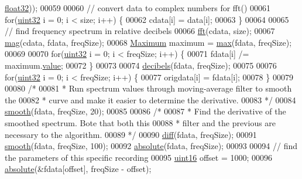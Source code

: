 \begin{DoxyCode}
      \hyperlink{definitions_8hpp_aacdc525d6f7bddb3ae95d5c311bd06a1}{float32}));
00059 
00060         \textcolor{comment}{// convert data to complex numbers for fft()}
00061         \textcolor{keywordflow}{for}(\hyperlink{definitions_8hpp_a1134b580f8da4de94ca6b1de4d37975e}{uint32} i = 0; i < size; i++) \{
00062             cdata[i] = data[i];
00063         \}
00064     
00065         \textcolor{comment}{// find frequency spectrum in relative decibels}
00066         \hyperlink{namespacevaso_af74f08a8afd7967b6c2b3c2b0e5fb1e9}{fft}(cdata, size);
00067         \hyperlink{namespacevaso_a5d355b5c326a852e2ce95c258450898c}{mag}(cdata, fdata, freqSize);
00068         \hyperlink{structMaximum}{Maximum} maximum = \hyperlink{namespacevaso_a122846d728be312454a452d379915e10}{max}(fdata, freqSize);
00069 
00070         \textcolor{keywordflow}{for}(\hyperlink{definitions_8hpp_a1134b580f8da4de94ca6b1de4d37975e}{uint32} i = 0; i < freqSize; i++) \{
00071             fdata[i] /= maximum.\hyperlink{structMaximum_aa7e84cbf37b694670142670014366969}{value};
00072         \}
00073 
00074         \hyperlink{namespacevaso_af9bb2211cf3478333dfc1873bf316263}{decibels}(fdata, freqSize);
00075 
00076         \textcolor{keywordflow}{for}(\hyperlink{definitions_8hpp_a1134b580f8da4de94ca6b1de4d37975e}{uint32} i = 0; i < freqSize; i++) \{
00077             origdata[i] = fdata[i];
00078         \}
00079 
00080         \textcolor{comment}{/*}
00081 \textcolor{comment}{         * Run spectrum values through moving-average filter to smooth the}
00082 \textcolor{comment}{         * curve and make it easier to determine the derivative.}
00083 \textcolor{comment}{         */}
00084         \hyperlink{namespacevaso_a5b7fc1a58199e2cac989f417a9faa1ce}{smooth}(fdata, freqSize, 20);
00085 
00086         \textcolor{comment}{/*}
00087 \textcolor{comment}{         * Find the derivative of the smoothed spectrum. Bote that both this}
00088 \textcolor{comment}{         * filter and the previous are necessary to the algorithm.}
00089 \textcolor{comment}{         */}
00090         \hyperlink{namespacevaso_a7d108bce812e906d8b1810815774c7ea}{diff}(fdata, freqSize);
00091         \hyperlink{namespacevaso_a5b7fc1a58199e2cac989f417a9faa1ce}{smooth}(fdata, freqSize, 100);
00092         \hyperlink{namespacevaso_a6ca90add966ce1773fc59a6883e6cd0c}{absolute}(fdata, freqSize);
00093 
00094         \textcolor{comment}{// find the parameters of this specific recording}
00095         \hyperlink{definitions_8hpp_a05f6b0ae8f6a6e135b0e290c25fe0e4e}{uint16} offset = 1000;
00096         \hyperlink{namespacevaso_a6ca90add966ce1773fc59a6883e6cd0c}{absolute}(&fdata[offset], freqSize - offset);

\end{DoxyCode}
